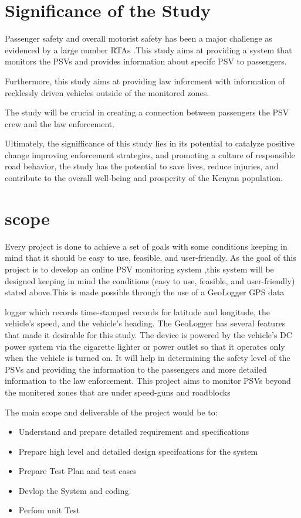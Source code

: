 \documentclass[a4paper, 12pt]{report}
\begin{document}
\section{Significance of the Study}
\noindent Passenger safety and overall motorist safety has been a major challenge as evidenced by a large number RTAs .This study aims at providing a system that
monitors the PSVs and provides information about specifc PSV to passengers.\par
Furthermore, this study aims at providing law inforcment with information of
recklessly driven vehicles outside of the monitored zones.\par
The study will be crucial in creating a connection between passengers the PSV
crew and the law enforcement.\par
Ultimately, the signifficance of this study lies in its potential to catalyze positive
change improving enforcement strategies, and promoting a culture of responsible road behavior, the study has the potential to save lives, reduce injuries, and
contribute to the overall well-being and prosperity of the Kenyan population.

\section{scope}
Every project is done to achieve a set of goals with some conditions keeping in
mind that it should be easy to use, feasible, and user-friendly. As the goal of
this project is to develop an online PSV monitoring system ,this system will be
designed keeping in mind the conditions (easy to use, feasible, and user-friendly)
stated above.This is made possible through the use of a GeoLogger GPS data

logger which records time-stamped records for latitude and longitude, the vehicle's
speed, and the vehicle's heading. The GeoLogger has several features that made
it desirable for this study. The device is powered by the vehicle's DC power
system via the cigarette lighter or power outlet so that it operates only when the
vehicle is turned on. It will help in determining the safety level of the PSVs and
providing the information to the passengers and more detailed information to the
law enforcement. This project aims to monitor PSVs beyond the monitered zones
that are under speed-guns and roadblocks\par 
\noindent The main scope and deliverable of the project would be to:
\begin{itemize}
\item Understand and prepare detailed requirement and specifications
\item Prepare high level and detailed design specifcations for the system
\item Prepare Test Plan and test cases
\item Devlop the System and coding.
\item Perfom unit Test

\end{itemize}
\end{document}
